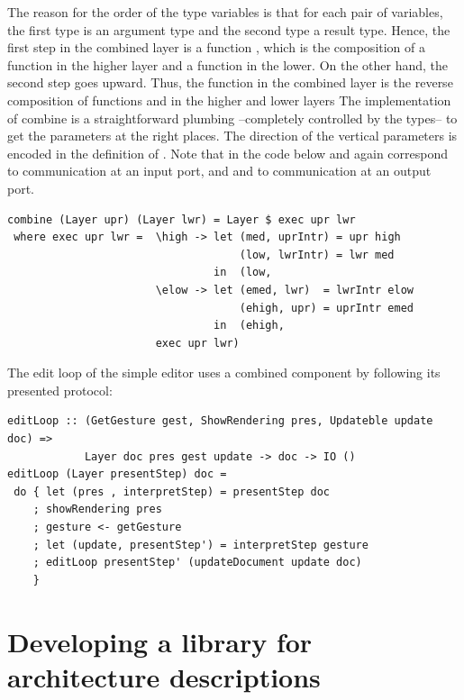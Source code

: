 \documentclass{llncs}
\begin{document}
The reason for the order of the type variables is that for each pair of variables, the first type is an argument type and the second type  a result type. Hence, the first step in the combined layer is a function , which is the composition of a function  in the higher layer and a function  in the lower. On the other hand, the second step goes upward.  Thus, the function  in the combined layer is the reverse composition of functions  and  in the higher and lower layers 
The implementation of combine is a straightforward plumbing --completely controlled by the types-- to get the parameters at the right places. The direction of the vertical parameters is encoded in the definition of . Note that in the code below  and  again correspond to communication at an input port, and  and  to communication at an output port.

\begin{small}
\begin{verbatim}
combine (Layer upr) (Layer lwr) = Layer $ exec upr lwr
 where exec upr lwr =  \high -> let (med, uprIntr) = upr high 
                                    (low, lwrIntr) = lwr med
                                in  (low, 
                       \elow -> let (emed, lwr)  = lwrIntr elow 
                                    (ehigh, upr) = uprIntr emed
                                in  (ehigh, 
                       exec upr lwr)
\end{verbatim}%
\end{small}

The edit loop of the simple editor uses a combined component by following its presented  protocol:

\begin{small}
\begin{verbatim}
editLoop :: (GetGesture gest, ShowRendering pres, Updateble update doc) =>
            Layer doc pres gest update -> doc -> IO ()
editLoop (Layer presentStep) doc = 
 do { let (pres , interpretStep) = presentStep doc    
    ; showRendering pres
    ; gesture <- getGesture    
    ; let (update, presentStep') = interpretStep gesture      
    ; editLoop presentStep' (updateDocument update doc)
    }
\end{verbatim}
\end{small}



\section{Developing a library for architecture descriptions} \label{sect:lib}
\end{document}
